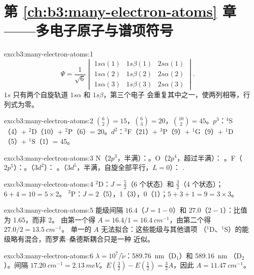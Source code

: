 \section*{第 \ref{ch:b3:many-electron-atoms} 章——多电子原子与谱项符号}

\begin{solution}{exo:b3:many-electron-atoms:1}
\[
\Psi = \frac{1}{\sqrt6}\begin{vmatrix}1s\alpha(1) & 1s\beta(1) & 2s\alpha(1)\\
1s\alpha(2) & 1s\beta(2) & 2s\alpha(2)\\ 1s\alpha(3) & 1s\beta(3) & 2s\alpha(3)
\end{vmatrix}.
\]
$1s$ 只有两个自旋轨道 $1s\alpha$ 和 $1s\beta$，第三个电子
会重复其中之一，使两列相等，行列式为零。
\end{solution}

\begin{solution}{exo:b3:many-electron-atoms:2}
$\binom62 = 15$，$\binom63 = 20$，$\binom{10}{2} = 45$。$p^3$：${}^4$S（4）+
${}^2$D（10）+ ${}^2$P（6）= 20。$d^2$：${}^3$F（21）+ ${}^3$P（9）+ ${}^1$G（9）+
${}^1$D（5）+ ${}^1$S（1）= 45。
\end{solution}

\begin{solution}{exo:b3:many-electron-atoms:3}
N（$2p^3$，半满）：。O（$2p^4$，超过半满）：
。F（$2p^5$）：。（$3d^2$）：
。（$3d^5$，半满，自旋全部平行，$L = 0$）：
.
\end{solution}

\begin{solution}{exo:b3:many-electron-atoms:4}
${}^2$D：$J = \frac52$（6 个状态）和 $\frac32$（4 个状态）；$6 + 4 = 10 = 5 \times 2$。
${}^3$P：$J = 2$（5），1（3），0（1）；$5 + 3 + 1 = 9 = 3 \times 3$。
\end{solution}

\begin{solution}{exo:b3:many-electron-atoms:5}
能级间隔 $16.4$（$J = 1 - 0$）和 $27.0$（$2 - 1$）：比值为 1.65，而非 2。
由第一个得 $A = 16.4/1 = \qty{16.4}{cm^{-1}}$，由第二个得 $27.0/2 = \qty{13.5}{cm^{-1}}$。
单一的 $A$ 无法拟合：这些能级与其他谱项
（${}^1$D、${}^1$S）的能级略有混合，而罗素–桑德斯耦合只是一种
近似。
\end{solution}

\begin{solution}{exo:b3:many-electron-atoms:6}
$\lambda = 10^7/\tilde\nu$：\qty{589.76}{nm}（D$_1$）和 \qty{589.16}{nm}
（D$_2$）。间隔 $\qty{17.20}{cm^{-1}} = \qty{2.13}{meV}$。$E(\frac32) -
E(\frac12) = \frac32A$，因此 $A = \qty{11.47}{cm^{-1}}$。
\end{solution}

